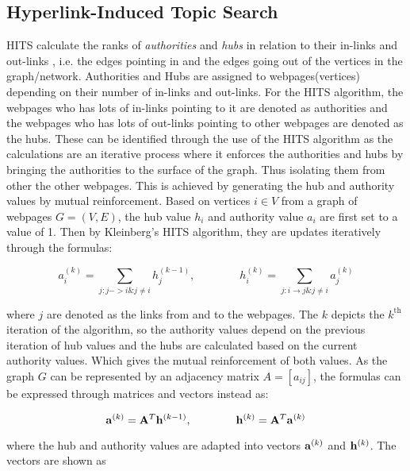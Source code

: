 \subsection{Hyperlink-Induced Topic Search}
HITS calculate the ranks of \emph{authorities} and \emph{hubs} in relation to their in-links and out-links \cite{langville2005survey}, i.e. the edges pointing in and the edges going out of the vertices in the graph/network.  Authorities and Hubs are assigned to webpages(vertices) depending on their number of in-links and out-links. For the HITS algorithm, the webpages who has lots of in-links pointing to it are denoted as authorities and the webpages who has lots of out-links pointing to other webpages are denoted as the hubs. These can be identified through the use of the HITS algorithm as the calculations are an iterative process where it enforces the authorities and hubs by bringing the authorities to the surface of the graph. Thus isolating them from other the other webpages. This is achieved by generating the hub and authority values by mutual reinforcement. Based on vertices $i \in V$ from a graph of webpages $G = (V , E)$, the hub value $h_i$ and authority value $a_i$ are first set to a value of 1. Then by Kleinberg's HITS algorithm, they are updates iteratively through the formulas:

\begin{equation}
a_i^(k) = \sum_{j:j->i \& j \ne i}h_j^{(k-1)} , \qquad \qquad h_i^(k) = \sum_{j:i \rightarrow j \& j \ne i}a_j^{(k)}
\end{equation}

where $j$ are denoted as the links from and to the webpages. The $k$ depicts the $k^{\text{th}}$ iteration of the algorithm, so the authority values depend on the previous iteration of hub values and the hubs are calculated based on the current authority values. Which gives the mutual reinforcement of both values. As the graph $G$ can be represented by an adjacency matrix $A = [a_{ij}]$, the formulas can be expressed through matrices \cite{chatzigeorgiou2006application} and vectors instead as:

\begin{equation}
\bold{a}^{(k)} = \bold{A}^{T}\bold{h}^{(k-1)} , \qquad \qquad \bold{h}^{(k)} = \bold{A}^{T}\bold{a}^{(k)}
\end{equation}

where the hub and authority values are adapted into vectors $\bold{a}^{(k)}$ and $\bold{h}^{(k)}$. The vectors are shown as


